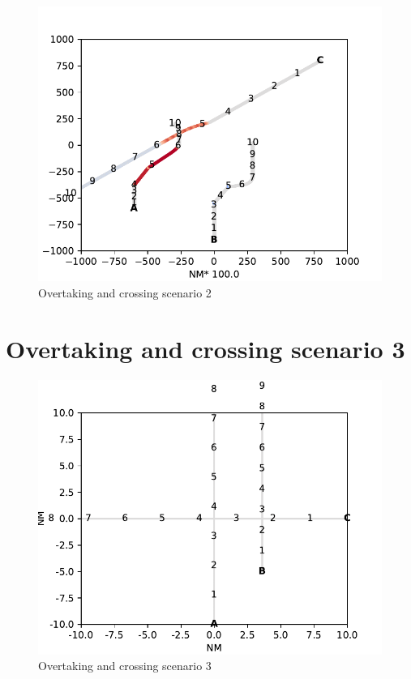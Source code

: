 \begin{figure}[h]
    \centering
    \includegraphics[width=\textwidth,height=0.75\textheight,keepaspectratio]{Figures/Scenario/overtaking-and-crossing-3-res.pdf}
    \caption{Overtaking and crossing scenario 2}
    \label{fig:overtaking-and-crossing-3-res}
\end{figure}
\section{Overtaking and crossing scenario 3}%

\begin{figure}[h]
    \centering
    \includegraphics[width=\textwidth,height=0.75\textheight,keepaspectratio]{Figures/Scenario/overtaking-and-crossing-2.pdf}
    \caption{Overtaking and crossing scenario 3 \cite{ecolreg_overtaking-and-crossing-2}}
    \label{fig:overtaking-and-crossing-2}
\end{figure}

